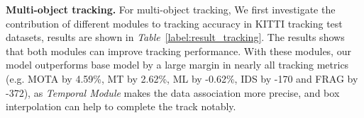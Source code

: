 \documentclass[a4paper, 10pt, conference]{ieeeconf}      %
\def\tablename{\emph{Table}}
\begin{document}
\begin{table}
	\vspace{-0.3cm}
	\caption{Comparison of publicly available methods in the KITTI Tracking Benchmark. The time for object detection is not included in the specified runtime.}
	\label{label:result_kitti}
\end{table}

\textbf{Multi-object tracking.} For multi-object tracking, We first investigate the contribution of different modules to tracking accuracy in KITTI tracking test datasets, results are shown in \tablename \, \ref{label:result_tracking}. The results shows that both modules can improve tracking performance. With these modules, our model outperforms base model by a large margin in nearly all tracking metrics (e.g. MOTA by 4.59\%, MT by 2.62\%, ML by -0.62\%, IDS by -170 and FRAG by -372), as \textit{Temporal Module} makes the data association more precise, and box interpolation can help to complete the track notably.  
\end{document}

